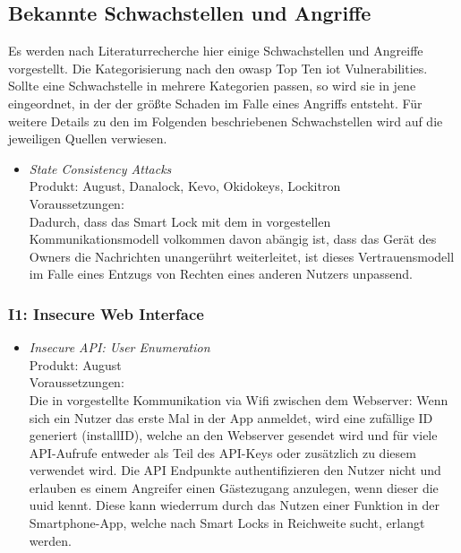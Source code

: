 \subsection{Bekannte Schwachstellen und Angriffe}
\label{sec:analysis_vulns}
    Es werden nach Literaturrecherche hier einige Schwachstellen und Angreiffe vorgestellt. 
    Die Kategorisierung nach den \gls{owasp} Top Ten \gls{iot} Vulnerabilities\cite{Miessler2015}. 
    Sollte eine Schwachstelle in mehrere Kategorien passen, so wird sie in jene eingeordnet, in der der größte Schaden im Falle eines Angriffs entsteht.
    Für weitere Details zu den im Folgenden beschriebenen Schwachstellen wird auf die jeweiligen Quellen verwiesen.

    \begin{itemize}[leftmargin=0cm,label={}]
        \item \emph{State Consistency Attacks}\cite{Ho2016}\\
            Produkt: August, Danalock, Kevo, Okidokeys, Lockitron\\
            Voraussetzungen: \\
            Dadurch, dass das Smart Lock mit dem in  vorgestellen Kommunikationsmodell volkommen davon abängig ist, dass das Gerät des Owners die Nachrichten unangerührt weiterleitet, ist dieses Vertrauensmodell im Falle eines Entzugs von Rechten eines anderen Nutzers unpassend.
    \end{itemize}
	
    \subsubsection*{I1: Insecure Web Interface}
       \begin{itemize}[leftmargin=0cm,label={}]
            \item \emph{Insecure API: User Enumeration}\cite{Fuller2017,Lariviere2015}\label{enum:user_enum}\\
                Produkt: August\\
                Voraussetzungen: \\
                Die in  vorgestellte Kommunikation via Wifi zwischen dem Webserver: 
                Wenn sich ein Nutzer das erste Mal in der App anmeldet, wird eine zufällige ID generiert (installID), welche an den Webserver gesendet wird und für viele API-Aufrufe entweder als Teil des API-Keys oder zusätzlich zu diesem verwendet wird. 
                Die API Endpunkte authentifizieren den Nutzer nicht und erlauben es einem Angreifer einen Gästezugang anzulegen, wenn dieser die \gls{uuid} kennt.
                Diese kann wiederrum durch das Nutzen einer Funktion in der Smartphone-App, welche nach Smart Locks in Reichweite sucht, erlangt werden. 
       \end{itemize} 
       
